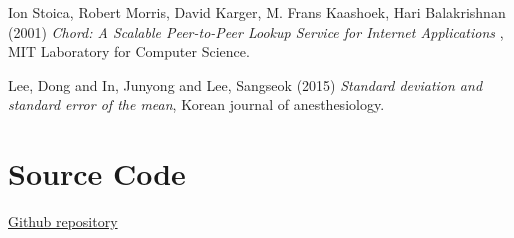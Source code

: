 \documentclass[
    a4paper,
    twocolumn,
]{article}
\begin{document}
\begin{thebibliography}{9}	
	Ion Stoica, Robert Morris, David Karger, M. Frans Kaashoek, Hari Balakrishnan (2001) \emph{Chord: A Scalable Peer-to-Peer Lookup Service for Internet Applications }, MIT Laboratory for Computer Science.
	
	Lee, Dong and In, Junyong and Lee, Sangseok (2015) \emph{Standard deviation and standard error of the mean}, Korean journal of anesthesiology.
\end{thebibliography}

\appendix
\section{Source Code}
\href{https://github.com/YasiruR/dht/tree/master}{Github repository}
\end{document}
